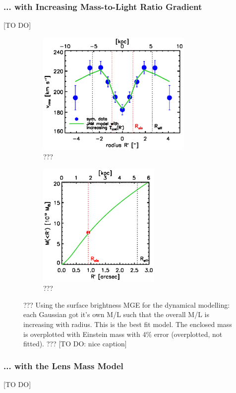 \subsubsection{... with Increasing Mass-to-Light Ratio Gradient}

[TO DO]

\begin{figure}
\centering
\begin{subfigure}{.5\textwidth}
  \centering
  \includegraphics[height=6cm]{fig/jam_G_vrms.ps}
  \caption{???}
  \label{fig:???}
\end{subfigure}%
\begin{subfigure}{.5\textwidth}
  \centering
  \includegraphics[height=6cm]{fig/jam_G_enclMass.ps}
  \caption{???}
  \label{fig:???}
\end{subfigure}
\caption{??? Using the surface brightness MGE for the dynamical modelling: each Gaussian got it's own M/L such that the overall M/L is increasing with radius. This is the best fit model. The enclosed mass is overplotted with Einstein mass with 4\% error (overplotted, not fitted). ??? [TO DO: nice caption]}
\label{fig:???}
\end{figure}

\subsubsection{... with the Lens Mass Model}

[TO DO]
